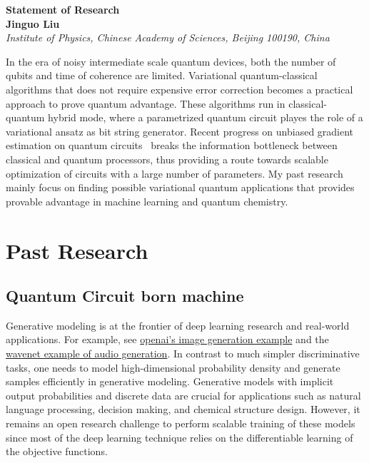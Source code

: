 \documentclass[aps,longbibliography,english,superscriptaddress]{revtex4-1}
\begin{document}
\begin{center}
    \vspace*{1cm}

    \Huge
    \textbf{Statement of Research}\\
    \vspace{0.5cm}
    \large
    \textbf{Jinguo Liu}\\
    \vspace{0.5cm}
    \small\textit{Institute of Physics, Chinese Academy of Sciences, Beijing 100190, China}
    \vspace{0.5cm}
\end{center}

In the era of noisy intermediate scale quantum devices, both the number of qubits and time of coherence are limited. Variational quantum-classical algorithms that does not require expensive error correction becomes a practical approach to prove quantum advantage. These algorithms run in classical-quantum hybrid mode, where a parametrized quantum circuit playes the role of a variational ansatz as bit string generator. Recent progress on unbiased gradient estimation on quantum circuits~\cite{Li2017a, Mitarai2018} breaks the information bottleneck between classical and quantum processors, thus providing a route towards scalable optimization of circuits with a large number of parameters.
My past research mainly focus on finding possible variational quantum applications that provides provable advantage in machine learning and quantum chemistry.

\section{Past Research}
\subsection{Quantum Circuit born machine}
Generative modeling is at the frontier of deep learning research and real-world applications. For example, see \href{https://blog.openai.com/generative-models/}{openai's image generation example} and the \href{https://deepmind.com/blog/wavenet-generative-model-raw-audio/}{wavenet example of audio generation}. In contrast to much simpler discriminative tasks, one needs to model high-dimensional probability density and generate samples efficiently in generative modeling. Generative models with implicit output probabilities and discrete data are crucial for applications such as natural language processing, decision making, and chemical structure design. However, it remains an open research challenge to perform scalable training of these models since most of the deep learning technique relies on the differentiable learning of the objective functions. 
\end{document}
